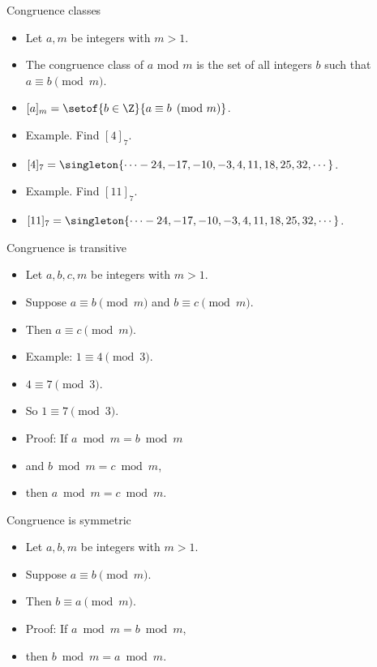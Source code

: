 \documentclass[handout]{beamer}
\begin{document}
\begin{frame}{Congruence classes}

\begin{itemize}
  \item  Let $a,m$ be integers with $m>1$.
  \item The congruence class of $a$ mod $m$ is the set of all integers $b$ such that $a\equiv b \pmod m$.
  \item $[a]_m = \setof{b\in\Z}{a\equiv b \pmod m}$.
  \item Example. Find $[4]_7$.
  \item $[4]_7 = \singleton{\cdots -24, -17, -10, -3, 4, 11, 18, 25, 32, \cdots}$.
  \item Example. Find $[11]_7$.
  \item $[11]_7 = \singleton{\cdots -24, -17, -10, -3, 4, 11, 18, 25, 32, \cdots}$.
\end{itemize}

\end{frame}

\begin{frame}{Congruence is transitive}

\begin{itemize}
  \item  Let $a,b,c,m$ be integers with $m>1$.
  \item Suppose $a\equiv b \pmod m$ and $b \equiv c \pmod m$.
  \item Then $a\equiv c \pmod m$.
  \item Example: $1 \equiv 4 \pmod 3$.
  \item $4 \equiv 7 \pmod 3$.
  \item So $1 \equiv 7 \pmod 3$.
  \item Proof: If $a \bmod m = b \bmod m$
  \item and $b \bmod m = c \bmod m$,
  \item then $a\bmod m = c \bmod m$.
\end{itemize}

\end{frame}


\begin{frame}{Congruence is symmetric}

\begin{itemize}
  \item  Let $a,b,m$ be integers with $m>1$.
  \item Suppose $a\equiv b \pmod m$.
  \item Then $b\equiv a \pmod m$.
  \item Proof: If $a \bmod m = b \bmod m$,
  \item then $b\bmod m = a \bmod m$.
\end{itemize}

\end{frame}
\end{document}
